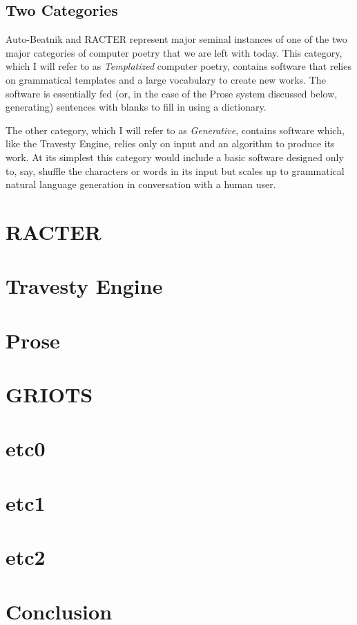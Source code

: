 \documentclass[10pt]{article}
\begin{document}
\subsection{Two Categories}
Auto-Beatnik and RACTER represent major seminal instances of one of the two
major categories of computer poetry that we are left with today. This category,
which I will refer to as \emph{Templatized} computer poetry, contains software
that relies on grammatical templates and a large vocabulary to create new
works. The software is essentially fed (or, in the case of the Prose system
discussed below, generating) sentences with blanks to fill in using a
dictionary.

The other category, which I will refer to as \emph{Generative}, contains
software which, like the Travesty Engine, relies only on input and an algorithm
to produce its work. At its simplest this category would include a basic
software designed only to, say, shuffle the characters or words in its input
but scales up to grammatical natural language generation in conversation with a
human user.

\section{RACTER}
\section{Travesty Engine}
\section{Prose}
\section{GRIOTS}
\section{etc0}
\section{etc1}
\section{etc2}
\section{Conclusion}



\end{document}
